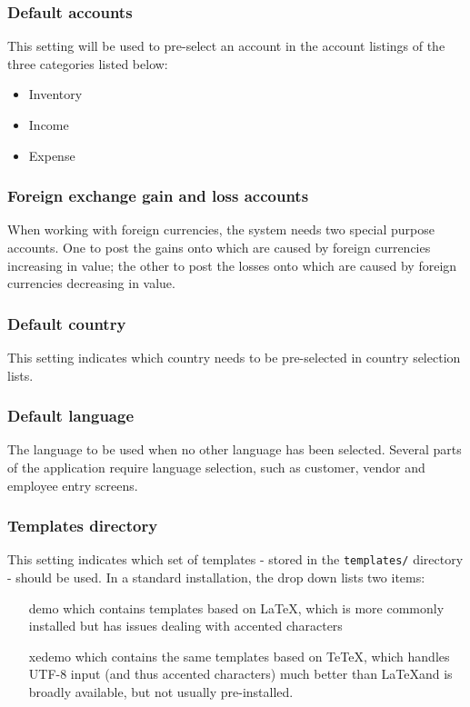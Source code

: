 \documentclass[10pt,A4]{book}
\begin{document}
\subsubsection{Default accounts}

 This setting will be used to pre-select an account in
the account listings of the three categories listed below:
\begin{itemize}
\item Inventory
\item Income
\item Expense
\end{itemize}


\subsubsection{Foreign exchange gain and loss accounts}

When working with foreign currencies,
the system needs two special purpose accounts. One to post the gains onto which are
caused by foreign currencies increasing in value; the other to post the losses onto
which are caused by foreign currencies decreasing in value.


\subsubsection{Default country}

This setting indicates which country needs to be pre-selected
   in country selection lists.


\subsubsection{Default language}

The language to be used when no other language has been selected. Several parts of the
application require language selection, such as customer, vendor and employee entry screens.

\subsubsection{Templates directory}

This setting indicates which set of templates - stored in the
   \texttt{templates/} directory - should be used. In a standard installation, the drop down
   lists two items:
   \begin{itemize}
   \item [demo] which contains templates based on \LaTeX, which is more commonly installed but has issues dealing with accented characters
   \item [xedemo] which contains the same templates based on TeTeX, which handles UTF-8 input (and thus accented characters) much better than \LaTeX and is broadly available, but not usually pre-installed.
   \end{itemize}
\end{document}
